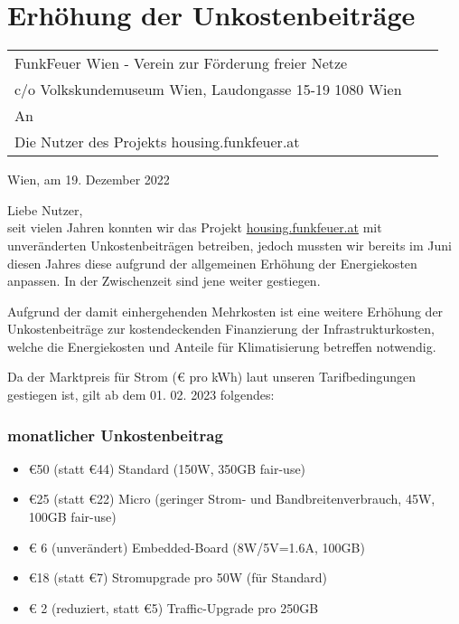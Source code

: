 \documentclass[parskip=half]{scrreprt}
\begin{document}
\vspace{4cm}
\chapter*{Erhöhung der Unkostenbeiträge}
\thispagestyle{fancy}

\begin{tabular}{p{8cm}p{}l}
	
	\vspace{1cm}
	
	{\scriptsize FunkFeuer Wien - Verein zur Förderung freier Netze}\\
	\vspace{-1em}
	{\scriptsize c/o Volkskundemuseum Wien, Laudongasse 15-19 1080 Wien}\\
	An\\ 
	Die Nutzer des Projekts housing.funkfeuer.at
	
\end{tabular}
\begin{flushright}
Wien, am 19. Dezember 2022
\end{flushright}
\vspace{0.5cm}

Liebe Nutzer, \\ 

seit vielen Jahren konnten wir das Projekt \href{https://housing.funkfeuer.at}{housing.funkfeuer.at} mit unveränderten Unkostenbeiträgen betreiben, jedoch mussten wir bereits im Juni diesen Jahres diese aufgrund der allgemeinen Erhöhung der Energiekosten anpassen. In der Zwischenzeit sind jene weiter gestiegen.

Aufgrund der damit einhergehenden Mehrkosten ist eine weitere Erhöhung der Unkostenbeiträge zur kostendeckenden Finanzierung der Infrastrukturkosten, welche die Energiekosten und Anteile für Klimatisierung betreffen notwendig.

Da der Marktpreis für Strom (€ pro kWh) laut unseren Tarifbedingungen gestiegen ist, gilt ab dem 01. 02. 2023 folgendes:

\subsection*{monatlicher Unkostenbeitrag}
\begin{itemize}
	\item €50 (statt €44) Standard (150W, 350GB fair-use)
	\item €25 (statt €22) Micro (geringer Strom- und Bandbreitenverbrauch, 45W, 100GB fair-use)
	\item € 6 (unverändert) Embedded-Board (8W/5V=1.6A, 100GB)
	\item €18 (statt €7) Stromupgrade pro 50W (für Standard)
	\item € 2 (reduziert, statt €5) Traffic-Upgrade pro 250GB
\end{itemize}
\end{document}
